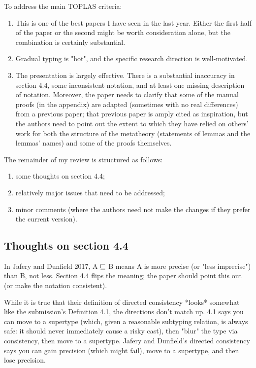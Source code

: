 \documentclass[dvipsnames]{article}
\begin{document}
To address the main TOPLAS criteria:

\begin{enumerate}
\item This is one of the best papers I have seen in the last year. Either the
  first half of the paper or the second might be worth consideration alone, but
  the combination is certainly substantial.
\item Gradual typing is "hot", and the specific research direction is
  well-motivated.
\item The presentation is largely effective. There is a substantial inaccuracy
  in section 4.4, some inconsistent notation, and at least one missing
  description of notation. Moreover, the paper needs to clarify that some of the
  manual proofs (in the appendix) are adapted (sometimes with no real
  differences) from a previous paper; that previous paper is amply cited as
  inspiration, but the authors need to point out the extent to which they have
  relied on others' work for both the structure of the metatheory (statements of
  lemmas and the lemmas' names) and some of the proofs themselves.
\end{enumerate}

The remainder of my review is structured as follows:
\begin{enumerate}
\item some thoughts on section 4.4;
\item relatively major issues that need to be addressed;
\item minor comments (where the authors need not make the changes if they prefer the current version).
\end{enumerate}

\subsection{Thoughts on section 4.4}

In Jafery and Dunfield 2017, A $\sqsubseteq$ B means A is more precise (or "less
imprecise") than B, not less. Section 4.4 flips the meaning; the paper should
point this out (or make the notation consistent).

While it is true that their definition of directed consistency *looks* somewhat
like the submission's Definition 4.1, the directions don't match up. 4.1 says
you can move to a supertype (which, given a reasonable subtyping relation, is
always safe: it should never immediately cause a risky cast), then "blur" the
type via consistency, then move to a supertype. Jafery and Dunfield's directed
consistency says you can gain precision (which might fail), move to a supertype,
and then lose precision.
\end{document}
